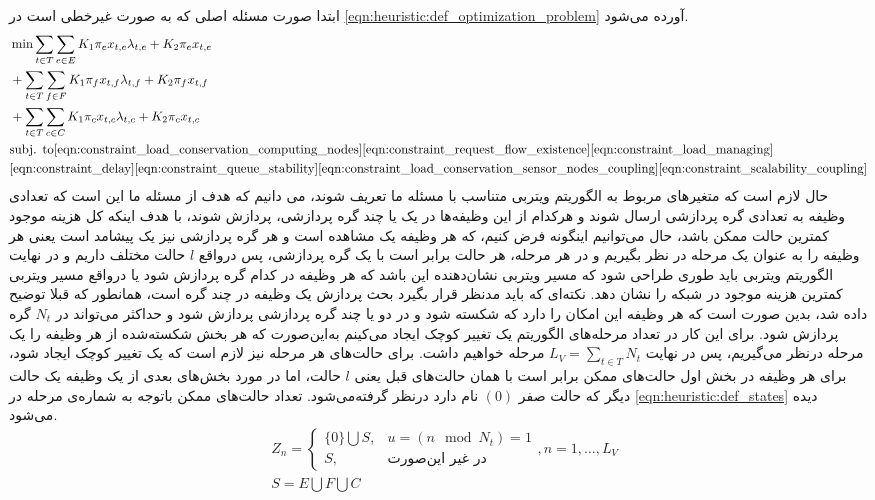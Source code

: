 	ابتدا صورت مسئله اصلی که به صورت غیرخطی است در \cref{eqn:heuristic:def_optimization_problem} آورده می‌شود. 
	\begin{align}\label{eqn:heuristic:def_optimization_problem}
		& \min \sum_{t \in T}\sum_{e \in E} K_1\pi_ex_{t,e}\lambda_{t,e} + K_2\pi_ex_{t,e} \notag \\
		& + \sum_{t \in T}\sum_{f \in F} K_1\pi_fx_{t,f}\lambda_{t,f} + K_2\pi_fx_{t,f} \notag \\
		& + \sum_{t \in T}\sum_{c \in C} K_1\pi_cx_{t,c}\lambda_{t,c} + K_2\pi_cx_{t,c} \notag \\
		&\text{subj. to}  %
		\cref{eqn:constraint_load_conservation_computing_nodes}
		\cref{eqn:constraint_request_flow_existence}
		\cref{eqn:constraint_load_managing}\notag \\
		&\cref{eqn:constraint_delay}
		\cref{eqn:constraint_queue_stability}
		\cref{eqn:constraint_load_conservation_sensor_nodes_coupling}
		\cref{eqn:constraint_scalability_coupling}
	\end{align}
	حال لازم است که متغیرهای مربوط به الگوریتم ویتربی متناسب با مسئله‌ ما تعریف شوند، می دانیم که هدف از مسئله ما این است که تعدادی وظیفه به تعدادی گره پردازشی ارسال شوند و هرکدام از این وظیفه‌ها در یک یا چند گره پردازشی، پردازش شوند، با هدف اینکه کل هزینه موجود کمترین حالت ممکن باشد، حال می‌توانیم اینگونه فرض کنیم، که هر وظیفه یک مشاهده است و هر گره پردازشی نیز یک پیشامد است یعنی هر وظیفه را به عنوان یک مرحله در نظر بگیریم و در هر مرحله، هر حالت برابر است با یک گره پردازشی، پس درواقع $l$ حالت مختلف داریم و در نهایت الگوریتم ویتربی باید طوری طراحی شود که مسیر ویتربی نشان‌دهنده این باشد که هر وظیفه در کدام گره پردازش شود یا درواقع مسیر ویتربی کمترین هزینه موجود در شبکه را نشان دهد.
	نکته‌ای که باید مدنظر قرار بگیرد بحث پردازش یک وظیفه در چند گره است، همانطور که قبلا توضیح داده شد، بدین صورت است که هر وظیفه این امکان را دارد که شکسته شود و در دو یا چند گره پردازشی پردازش شود و حداکثر می‌تواند در $N_t$ گره پردازش شود. 
	برای این کار در تعداد مرحله‌های الگوریتم یک تغییر کوچک ایجاد می‌کینم به‌این‌صورت که هر بخش شکسته‌شده از هر وظیفه را یک مرحله درنظر می‌گیریم، پس در نهایت $ \displaystyle L_V=\sum_{t \in T} N_t$ مرحله خواهیم داشت. 
	برای حالت‌های هر مرحله نیز لازم است که یک تغییر کوچک ایجاد شود، برای هر وظیفه در بخش اول حالت‌های ممکن برابر است با همان حالت‌های قبل یعنی $l$ حالت، اما در مورد بخش‌های بعدی از یک وظیفه یک حالت دیگر که حالت صفر $(0)$ نام دارد درنظر گرفته‌می‌شود. تعداد حالت‌های ممکن باتوجه به شماره‌ی مرحله در \cref{eqn:heuristic:def_states} دیده می‌شود. 
	\begin{subequations}\label{eqn:heuristic:def_states}
		\begin{align}
			&Z_n =
			\begin{cases}
			\{0\} \bigcup S, & \text{$u = (n \mod N_t) = 1$} \\
			S,               & \text{در غیر این‌صورت}
			\end{cases}
			,n = 1, \dots, L_V \\
			&S = E \bigcup F \bigcup C
		\end{align}
	\end{subequations}

